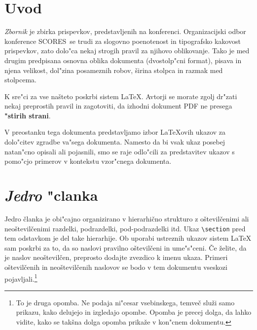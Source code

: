 \documentclass[sigconf,nonacm]{acmart}
\newcommand{\scores}{\textsc{SCORES}}
\begin{document}

\maketitle

\section{Uvod}

\emph{Zbornik} je zbirka prispevkov, predstavljenih na konferenci.
Organizacijski odbor konference \scores\ se trudi za slogovno poenotenost in
tipografsko kakovost prispevkov, zato dolo"ca nekaj strogih pravil za njihovo
oblikovanje.  Tako je med drugim predpisana osnovna oblika dokumenta
(dvostolp"cni format), pisava in njena velikost, dol"zina posameznih robov,
širina stolpca in razmak med stolpcema.

K sre"ci za vse našteto poskrbi sistem \LaTeX.  Avtorji se morate zgolj
dr"zati nekaj preprostih pravil in zagotoviti, da izhodni dokument PDF ne
presega \textbf{"stirih strani}.

V preostanku tega dokumenta predstavljamo izbor \LaTeX{}ovih ukazov za
dolo"citev zgradbe va"sega dokumenta.  Namesto da bi vsak ukaz posebej
natan"cno opisali ali pojasnili, smo se raje odlo"cili za predstavitev ukazov
s pomo"cjo primerov v kontekstu vzor"cnega dokumenta.

\section{\emph{Jedro} "clanka}

Jedro članka je obi"cajno organizirano v hierarhično strukturo z oštevilčenimi
ali neoštevilčenimi razdelki, podrazdelki, pod-podrazdelki itd.  Ukaz
\texttt{\textbackslash{}section} pred tem odstavkom je del take hierarhije.
Ob uporabi ustreznih ukazov sistem \LaTeX{} sam poskrbi za to, da so naslovi
pravilno oštevilčeni in ume"s"ceni.  Če želite, da je naslov neoštevilčen,
preprosto dodajte zvezdico k imenu ukaza.  Primeri oštevilčenih in
neoštevilčenih naslovov se bodo v tem dokumentu vseskozi
pojavljali.\footnote{To je druga opomba. Ne podaja ni"cesar vsebinskega,
temveč služi samo prikazu, kako delujejo in izgledajo opombe.  Opomba je
precej dolga, da lahko vidite, kako se takšna dolga opomba prikaže v kon"cnem
dokumentu.}
\end{document}
